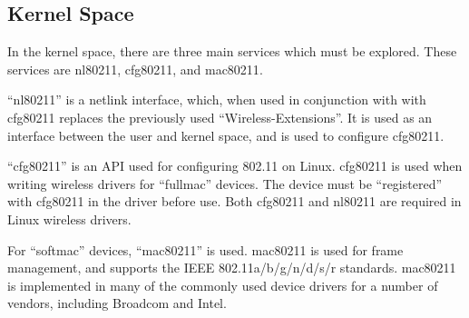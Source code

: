 \subsection{Kernel Space}

In the kernel space, there are three main services which must be explored. These
services are nl80211, cfg80211, and mac80211\cite{chou_2015}.

``nl80211'' is a netlink interface, which, when used in conjunction with with
cfg80211 replaces the previously used ``Wireless-Extensions''\cite{nl80211}.
It is used as an interface between the user and kernel space, and is used to
configure cfg80211.

``cfg80211'' is an API used for configuring 802.11 on Linux. cfg80211 is used
when writing wireless drivers for ``fullmac'' devices\cite{cfg80211}. The device
must be ``registered'' with cfg80211 in the driver before use. Both cfg80211 and
nl80211 are required in Linux wireless drivers\cite{cfg80211_subsystem}.

For ``softmac'' devices, ``mac80211'' is used. mac80211 is used for frame
management, and supports the IEEE 802.11a/b/g/n/d/s/r standards\cite{mac80211}.
mac80211 is implemented in many of the commonly used device drivers for a number of
vendors, including Broadcom and Intel\cite{drivers}.
